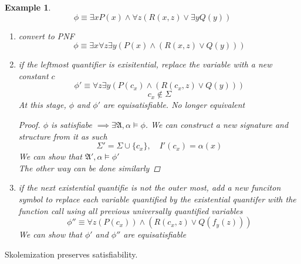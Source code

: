 \documentclass{article}
\newtheorem{theorem}{Theorem}[section]
\newtheorem{example}[theorem]{Example}
\let\oldtheorem\theorem
\let\endoldtheorem\endtheorem
\renewenvironment{theorem}
  {\begin{tcolorbox}[
      colback=yellow!6,
      colframe=yellow!60!black,
      boxrule=0.6pt,
      arc=2pt,
      left=6pt,right=6pt,top=4pt,bottom=4pt,
      parbox=false
    ]\oldtheorem}
  {\endoldtheorem\end{tcolorbox}}
\begin{document}
\begin{example}
    \[\phi \equiv \exists x P(x) \land \forall z(R(x, z) \lor \exists y Q(y))\]
    \begin{enumerate}
        \item convert to PNF
        \[\phi \equiv \exists x \forall z \exists y (P(x) \land (R(x, z) \lor Q(y)))\]
        \item if the leftmost quantifier is exisitential, replace the variable with a new constant $c$
        \[\phi' \equiv \forall z \exists y (P(c_x) \land (R(c_x, z) \lor Q(y)))\]
        \[c_x \notin \Sigma\]
        At this stage, $\phi$ and $\phi'$ are equisatisfiable. No longer equivalent
        \begin{proof}
            $\phi$ is satisfiabe $\implies \exists \mathfrak{A}, \alpha \models \phi$. We can construct a new signature and structure from it as such
            \[\Sigma' = \Sigma \cup \{c_x\}, \quad I'(c_x) = \alpha(x)\]
            We can show that $\mathfrak{A}', \alpha \models \phi'$\\
            The other way can be done similarly
        \end{proof}
        \item if the next existential quantifie is not the outer most, add a new funciton symbol to replace each variable quantified by the existential
        quantifer with the function call using all previous universally quantified variables
        \[\phi'' \equiv \forall z (P(c_x)) \land (R(c_x, z)\lor Q(f_y(z))) \]
        We can show that $\phi'$ and $\phi''$ are equisatisfiable
    \end{enumerate}
\end{example}

\begin{theorem}
    Skolemization preserves satisfiability.
\end{theorem}
\end{document}
